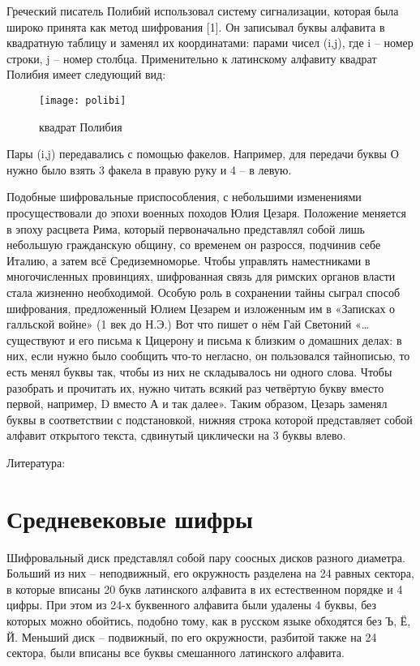 Греческий писатель Полибий использовал систему сигнализации, которая была широко принята как метод шифрования [1]. Он записывал буквы алфавита в квадратную таблицу и заменял их координатами: парами чисел (i,j), где i – номер строки, j – номер столбца. Применительно к латинскому алфавиту квадрат Полибия имеет следующий вид:

\begin{figure}[H]
	\texttt{[image: polibi]}
	\centering
	\caption{квадрат Полибия}
\end{figure}

Пары (i,j) передавались с помощью факелов. Например, для передачи буквы О нужно было взять 3 факела в правую руку и 4 – в левую.

Подобные шифровальные приспособления, с небольшими изменениями просуществовали до эпохи военных походов Юлия Цезаря. Положение меняется в эпоху расцвета Рима, который первоначально представлял собой лишь небольшую гражданскую общину, со временем он разросся, подчинив себе Италию, а затем всё Средиземноморье. Чтобы управлять наместниками в многочисленных провинциях, шифрованная связь для римских органов власти стала жизненно необходимой. Особую роль в сохранении тайны сыграл способ шифрования, предложенный Юлием Цезарем и изложенным им в «Записках о галльской войне» (1 век до Н.Э.) Вот что пишет о нём Гай Светоний «…существуют и его письма к Цицерону и письма к близким о домашних делах: в них, если нужно было сообщить что-то негласно, он пользовался тайнописью, то есть менял буквы так, чтобы из них не складывалось ни одного слова. Чтобы разобрать и прочитать их, нужно читать всякий раз четвёртую букву вместо первой, например, D вместо А и так далее». Таким образом, Цезарь заменял буквы в соответствии с подстановкой, нижняя строка которой представляет собой алфавит открытого текста, сдвинутый циклически на 3 буквы влево.



Литература: \cite{senthil2013modern}

\section{Средневековые шифры}

Шифровальный диск представлял собой пару соосных дисков разного диаметра. Больший из них – неподвижный, его окружность разделена на 24 равных сектора, в которые вписаны 20 букв латинского алфавита в их естественном порядке и 4 цифры. При этом из 24-х буквенного алфавита были удалены 4 буквы, без которых можно обойтись, подобно тому, как в русском языке обходятся без Ъ, Ё, Й. Меньший диск – подвижный, по его окружности, разбитой также на 24 сектора, были вписаны все буквы смешанного латинского алфавита.

